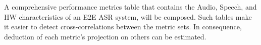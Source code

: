 A comprehensive performance metrics table that contains the Audio,
Speech, and HW characteristics
of an E2E ASR system, will be composed.
Such tables make it easier to detect cross-correlations between the metric sets.
In consequence, 
deduction of each metric's
projection on others can be estimated.






